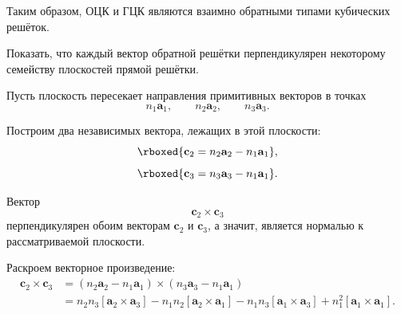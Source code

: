 \documentclass[../final.tex]{subfiles}
\begin{document}
Таким образом, ОЦК и ГЦК являются взаимно обратными
типами кубических решёток.




\condition
Показать, что каждый вектор обратной решётки перпендикулярен
некоторому семейству плоскостей прямой решётки.


%
%


Пусть плоскость пересекает направления примитивных векторов
в точках
%
\begin{equation*}
    n_1\mathbf a_1,
    \qquad
    n_2\mathbf a_2,
    \qquad
    n_3\mathbf a_3.
\end{equation*}

Построим два независимых вектора, лежащих в этой плоскости:
%
\begin{equation*}
    \rboxed{
        \mathbf c_2
        =
        n_2\mathbf a_2
        -
        n_1\mathbf a_1
    },
\end{equation*}
%
\begin{equation*}
    \rboxed{
        \mathbf c_3
        =
        n_3\mathbf a_3
        -
        n_1\mathbf a_1
    }.
\end{equation*}

Вектор
%
\begin{equation*}
    \mathbf c_2\times\mathbf c_3
\end{equation*}
%
перпендикулярен обоим векторам $\mathbf c_2$ и $\mathbf c_3$,
а значит, является нормалью к рассматриваемой плоскости.

Раскроем векторное произведение:
%
\begin{align*}
    \mathbf c_2\times\mathbf c_3
    &=
    \left(
        n_2\mathbf a_2-n_1\mathbf a_1
    \right)
    \times
    \left(
        n_3\mathbf a_3-n_1\mathbf a_1
    \right)
    \\
    &=
    n_2n_3
    [\mathbf a_2\times\mathbf a_3]
    -
    n_1n_2
    [\mathbf a_2\times\mathbf a_1]
    -
    n_1n_3
    [\mathbf a_1\times\mathbf a_3]
    +
    n_1^2
    [\mathbf a_1\times\mathbf a_1].
\end{align*}
\end{document}
